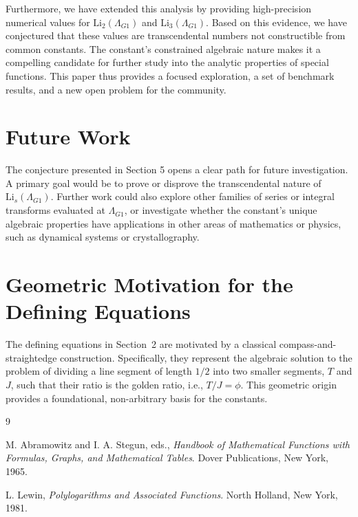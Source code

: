 \documentclass{amsart}
\theoremstyle{plain}
\theoremstyle{definition}
\theoremstyle{remark}
\newcommand{\LambdaG}{\Lambda_{G1}}
\begin{document}
Furthermore, we have extended this analysis by providing high-precision numerical values for $\mathrm{Li}_2(\LambdaG)$ and $\mathrm{Li}_3(\LambdaG)$. Based on this evidence, we have conjectured that these values are transcendental numbers not constructible from common constants. The constant's constrained algebraic nature makes it a compelling candidate for further study into the analytic properties of special functions. This paper thus provides a focused exploration, a set of benchmark results, and a new open problem for the community.

\section{Future Work}
The conjecture presented in Section 5 opens a clear path for future investigation. A primary goal would be to prove or disprove the transcendental nature of $\mathrm{Li}_s(\LambdaG)$. Further work could also explore other families of series or integral transforms evaluated at $\LambdaG$, or investigate whether the constant's unique algebraic properties have applications in other areas of mathematics or physics, such as dynamical systems or crystallography.

\appendix
\section{Geometric Motivation for the Defining Equations}
\label{app:A}
The defining equations in Section~2 are motivated by a classical compass-and-straightedge construction. Specifically, they represent the algebraic solution to the problem of dividing a line segment of length $1/2$ into two smaller segments, $T$ and $J$, such that their ratio is the golden ratio, i.e., $T/J = \phi$. This geometric origin provides a foundational, non-arbitrary basis for the constants.

\begin{thebibliography}{9}

M. Abramowitz and I. A. Stegun, eds.,
\textit{Handbook of Mathematical Functions with Formulas, Graphs, and Mathematical Tables}.
Dover Publications, New York, 1965.

L. Lewin,
\textit{Polylogarithms and Associated Functions}.
North Holland, New York, 1981.

\end{thebibliography}
\end{document}
